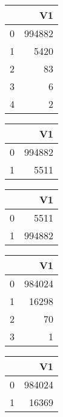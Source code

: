 \bigskip\bigskip
\centering
\begin{tabular}{rr}
  \hline
 & V1 \\ 
  \hline
0 & 994882 \\ 
  1 & 5420 \\ 
  2 &  83 \\ 
  3 &   6 \\ 
  4 &   2 \\ 
   \hline
\end{tabular}

\bigskip\bigskip
\centering
\begin{tabular}{rr}
  \hline
 & V1 \\ 
  \hline
0 & 994882 \\ 
  1 & 5511 \\ 
   \hline
\end{tabular}

\bigskip\bigskip
\centering
\begin{tabular}{rr}
  \hline
 & V1 \\ 
  \hline
0 & 5511 \\ 
  1 & 994882 \\ 
   \hline
\end{tabular}

\bigskip\bigskip
\centering
\begin{tabular}{rr}
  \hline
 & V1 \\ 
  \hline
0 & 984024 \\ 
  1 & 16298 \\ 
  2 &  70 \\ 
  3 &   1 \\ 
   \hline
\end{tabular}

\bigskip\bigskip
\centering
\begin{tabular}{rr}
  \hline
 & V1 \\ 
  \hline
0 & 984024 \\ 
  1 & 16369 \\ 
   \hline
\end{tabular}

